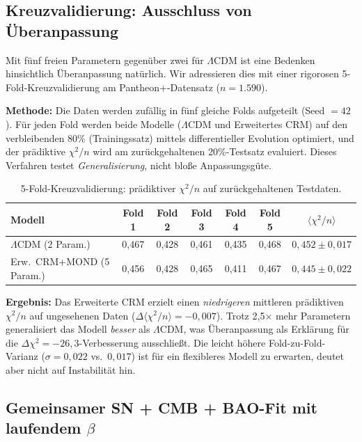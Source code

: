 \documentclass[aps,prd,twocolumn,superscriptaddress,nofootinbib,floatfix]{revtex4-2}
\begin{document}
\subsection{Kreuzvalidierung: Ausschluss von Überanpassung}
\label{subsec:crossval}

Mit fünf freien Parametern gegenüber zwei für $\Lambda$CDM ist eine Bedenken hinsichtlich Überanpassung natürlich. Wir adressieren dies mit einer rigorosen 5-Fold-Kreuzvalidierung am Pantheon+-Datensatz ($n = 1.590$).

\textbf{Methode:} Die Daten werden zufällig in fünf gleiche Folds aufgeteilt (Seed $= 42$). Für jeden Fold werden beide Modelle ($\Lambda$CDM und Erweitertes CRM) auf den verbleibenden 80\% (Trainingssatz) mittels differentieller Evolution optimiert, und der prädiktive $\chi^2/n$ wird am zurückgehaltenen 20\%-Testsatz evaluiert. Dieses Verfahren testet \textit{Generalisierung}, nicht bloße Anpassungsgüte.

\begin{table}
\centering
\caption{5-Fold-Kreuzvalidierung: prädiktiver $\chi^2/n$ auf zurückgehaltenen Testdaten.}
\label{tab:crossval}
\begin{tabular}{lcccccc}
\toprule
\textbf{Modell} & \textbf{Fold 1} & \textbf{Fold 2} & \textbf{Fold 3} & \textbf{Fold 4} & \textbf{Fold 5} & $\langle\chi^2/n\rangle$ \\
\midrule
$\Lambda$CDM (2 Param.) & 0,467 & 0,428 & 0,461 & 0,435 & 0,468 & $0{,}452 \pm 0{,}017$ \\
Erw.\ CRM+MOND (5 Param.) & 0,456 & 0,428 & 0,465 & 0,411 & 0,467 & $0{,}445 \pm 0{,}022$ \\
\bottomrule
\end{tabular}
\end{table}

\textbf{Ergebnis:} Das Erweiterte CRM erzielt einen \textit{niedrigeren} mittleren prädiktiven $\chi^2/n$ auf ungesehenen Daten ($\Delta\langle\chi^2/n\rangle = -0{,}007$). Trotz 2{,}5$\times$ mehr Parametern generalisiert das Modell \textit{besser} als $\Lambda$CDM, was Überanpassung als Erklärung für die $\Delta\chi^2 = -26{,}3$-Verbesserung ausschließt. Die leicht höhere Fold-zu-Fold-Varianz ($\sigma = 0{,}022$ vs.\ $0{,}017$) ist für ein flexibleres Modell zu erwarten, deutet aber nicht auf Instabilität hin.

\subsection{Gemeinsamer SN + CMB + BAO-Fit mit laufendem \texorpdfstring{$\beta$}{beta}}
\label{subsec:joint_fit}
\end{document}
